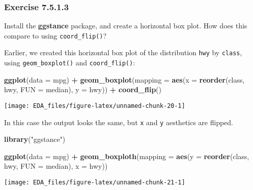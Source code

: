 \documentclass[]{book}
\newenvironment{Shaded}{\begin{snugshade}}{\end{snugshade}}
\newcommand{\DataTypeTok}[1]{\textcolor[rgb]{0.13,0.29,0.53}{#1}}
\newcommand{\KeywordTok}[1]{\textcolor[rgb]{0.13,0.29,0.53}{\textbf{#1}}}
\newcommand{\NormalTok}[1]{#1}
\newcommand{\OperatorTok}[1]{\textcolor[rgb]{0.81,0.36,0.00}{\textbf{#1}}}
\newcommand{\StringTok}[1]{\textcolor[rgb]{0.31,0.60,0.02}{#1}}
\theoremstyle{plain}
\theoremstyle{remark}
\begin{document}
\hypertarget{exercise-7.5.1.3}{%
\subsubsection*{\texorpdfstring{Exercise
{7.5.1.3}}{Exercise 7.5.1.3}}\label{exercise-7.5.1.3}}

Install the \textbf{ggstance} package, and create a horizontal box plot.
How does this compare to using \texttt{coord\_flip()}?

Earlier, we created this horizontal box plot of the distribution
\texttt{hwy} by \texttt{class}, using \texttt{geom\_boxplot()} and
\texttt{coord\_flip()}:

\begin{Shaded}
\begin{Highlighting}[]
\KeywordTok{ggplot}\NormalTok{(}\DataTypeTok{data =}\NormalTok{ mpg) }\OperatorTok{+}
\StringTok{  }\KeywordTok{geom_boxplot}\NormalTok{(}\DataTypeTok{mapping =} \KeywordTok{aes}\NormalTok{(}\DataTypeTok{x =} \KeywordTok{reorder}\NormalTok{(class, hwy, }\DataTypeTok{FUN =}\NormalTok{ median), }\DataTypeTok{y =}\NormalTok{ hwy)) }\OperatorTok{+}
\StringTok{  }\KeywordTok{coord_flip}\NormalTok{()}
\end{Highlighting}
\end{Shaded}

\begin{center}\texttt{[image: EDA\_files/figure-latex/unnamed-chunk-20-1]} \end{center}

In this case the output looks the same, but \texttt{x} and \texttt{y}
aesthetics are flipped.

\begin{Shaded}
\begin{Highlighting}[]
\KeywordTok{library}\NormalTok{(}\StringTok{"ggstance"}\NormalTok{)}

\KeywordTok{ggplot}\NormalTok{(}\DataTypeTok{data =}\NormalTok{ mpg) }\OperatorTok{+}
\StringTok{  }\KeywordTok{geom_boxploth}\NormalTok{(}\DataTypeTok{mapping =} \KeywordTok{aes}\NormalTok{(}\DataTypeTok{y =} \KeywordTok{reorder}\NormalTok{(class, hwy, }\DataTypeTok{FUN =}\NormalTok{ median), }\DataTypeTok{x =}\NormalTok{ hwy))}
\end{Highlighting}
\end{Shaded}

\begin{center}\texttt{[image: EDA\_files/figure-latex/unnamed-chunk-21-1]} \end{center}
\end{document}
